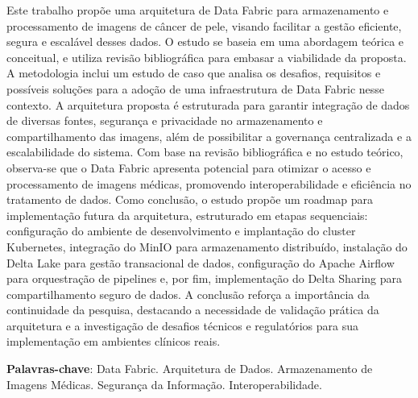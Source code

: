 \begin{resumo}
    Este trabalho propõe uma arquitetura de Data Fabric para armazenamento e processamento de imagens de câncer de pele, visando facilitar a gestão eficiente, segura e escalável desses dados. O estudo se baseia em uma abordagem teórica e conceitual, e utiliza revisão bibliográfica para embasar a viabilidade da proposta. A metodologia inclui um estudo de caso que analisa os desafios, requisitos e possíveis soluções para a adoção de uma infraestrutura de Data Fabric nesse contexto. A arquitetura proposta é estruturada para garantir integração de dados de diversas fontes, segurança e privacidade no armazenamento e compartilhamento das imagens, além de possibilitar a governança centralizada e a escalabilidade do sistema. Com base na revisão bibliográfica e no estudo teórico, observa-se que o Data Fabric apresenta potencial para otimizar o acesso e processamento de imagens médicas, promovendo interoperabilidade e eficiência no tratamento de dados. Como conclusão, o estudo propõe um roadmap para implementação futura da arquitetura, estruturado em etapas sequenciais: configuração do ambiente de desenvolvimento e implantação do cluster Kubernetes, integração do MinIO para armazenamento distribuído, instalação do Delta Lake para gestão transacional de dados, configuração do Apache Airflow para orquestração de pipelines e, por fim, implementação do Delta Sharing para compartilhamento seguro de dados. A conclusão reforça a importância da continuidade da pesquisa, destacando a necessidade de validação prática da arquitetura e a investigação de desafios técnicos e regulatórios para sua implementação em ambientes clínicos reais.
 \vspace{\onelineskip}
    
 \noindent
 \textbf{Palavras-chave}: Data Fabric. Arquitetura de Dados. Armazenamento de Imagens Médicas. Segurança da Informação. Interoperabilidade.
\end{resumo}
